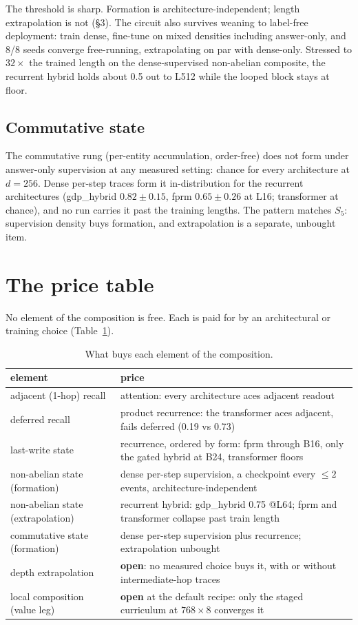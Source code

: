 \documentclass[11pt]{article}
\newcommand{\Sfive}{$S_5$}
\begin{document}
The threshold is sharp. Formation is architecture-independent; length extrapolation is not
(\S3). The circuit also survives weaning to label-free deployment: train dense, fine-tune on
mixed densities including answer-only, and 8/8 seeds converge free-running, extrapolating on
par with dense-only. Stressed to $32\times$ the trained length on the dense-supervised
non-abelian composite, the recurrent hybrid holds about 0.5 out to L512 while the looped block
stays at floor.

\subsection{Commutative state}

The commutative rung (per-entity accumulation, order-free) does not form under answer-only
supervision at any measured setting: chance for every architecture at $d=256$. Dense per-step
traces form it in-distribution for the recurrent architectures (gdp\_hybrid $0.82 \pm 0.15$,
fprm $0.65 \pm 0.26$ at L16; transformer at chance), and no run carries it past the training
lengths. The pattern matches \Sfive: supervision density buys formation, and extrapolation is a
separate, unbought item.

\section{The price table}

No element of the composition is free. Each is paid for by an architectural or training
choice (Table~\ref{tab:price}).

\begin{table}[h]
\centering
\small
\begin{tabular}{lp{9.5cm}}
\toprule
element & price \\
\midrule
adjacent (1-hop) recall & attention: every architecture aces adjacent readout \\
deferred recall & product recurrence: the transformer aces adjacent, fails deferred (0.19 vs 0.73) \\
last-write state & recurrence, ordered by form: fprm through B16, only the gated hybrid at B24, transformer floors \\
non-abelian state (formation) & dense per-step supervision, a checkpoint every $\le 2$ events, architecture-independent \\
non-abelian state (extrapolation) & recurrent hybrid: gdp\_hybrid 0.75 @L64; fprm and transformer collapse past train length \\
commutative state (formation) & dense per-step supervision plus recurrence; extrapolation unbought \\
depth extrapolation & \textbf{open}: no measured choice buys it, with or without intermediate-hop traces \\
local composition (value leg) & \textbf{open} at the default recipe: only the staged curriculum at $768\times8$ converges it \\
\bottomrule
\end{tabular}
\caption{What buys each element of the composition.}
\label{tab:price}
\end{table}
\end{document}
